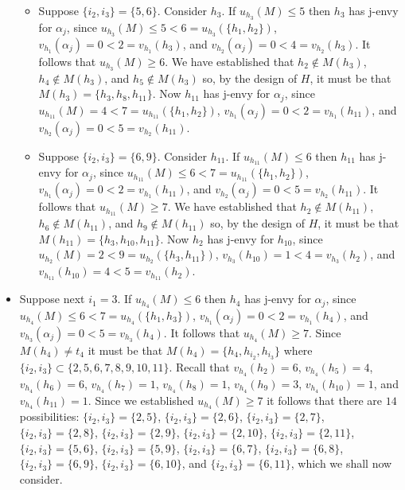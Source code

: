 \begin{itemize}
\begin{itemize}
    \item Suppose $\{ i_2, i_3 \} = \{ 5, 6 \}$. Consider $h_3$. If $u_{h_3}(M) \leq 5$ then $h_3$ has j-envy for $\alpha_{j}$, since $u_{h_3}(M) \leq 5 < 6 = u_{h_3}(\{ h_1, h_2 \})$, $v_{h_1}(\alpha_{j}) = 0 < 2 = v_{h_1}(h_3)$, and $v_{h_2}(\alpha_{j}) = 0 < 4 = v_{h_2}(h_3)$. It follows that $u_{h_3}(M) \geq 6$. We have established that $h_2 \notin M(h_3)$, $h_4 \notin M(h_3)$, and $h_5 \notin M(h_3)$ so, by the design of $H$, it must be that $M(h_3) = \{ h_3, h_8, h_{11} \}$. Now $h_{11}$ has j-envy for $\alpha_{j}$, since $u_{h_{11}}(M) = 4 < 7 = u_{h_{11}}(\{ h_1, h_2 \})$, $v_{h_1}(\alpha_{j}) = 0 < 2 = v_{h_1}(h_{11})$, and $v_{h_2}(\alpha_{j}) = 0 < 5 = v_{h_2}(h_{11})$.
    \item Suppose $\{ i_2, i_3 \} = \{ 6, 9 \}$. Consider $h_{11}$. If $u_{h_{11}}(M) \leq 6$ then $h_{11}$ has j-envy for $\alpha_{j}$, since $u_{h_{11}}(M) \leq 6 < 7 = u_{h_{11}}(\{ h_1, h_2 \})$, $v_{h_1}(\alpha_{j}) = 0 < 2 = v_{h_1}(h_{11})$, and $v_{h_2}(\alpha_{j}) = 0 < 5 = v_{h_2}(h_{11})$. It follows that $u_{h_{11}}(M) \geq 7$. We have established that $h_2 \notin M(h_{11})$, $h_6 \notin M(h_{11})$, and $h_9 \notin M(h_{11})$ so, by the design of $H$, it must be that $M(h_{11}) = \{ h_3, h_{10}, h_{11} \}$. Now $h_2$ has j-envy for $h_{10}$, since $u_{h_2}(M) = 2 < 9 = u_{h_2}(\{ h_3, h_{11} \})$, $v_{h_3}(h_{10}) = 1 < 4 = v_{h_3}(h_2)$, and $v_{h_{11}}(h_{10}) = 4 < 5 = v_{h_{11}}(h_2)$.
\end{itemize}
\item Suppose next $i_1 = 3$. If $u_{h_4}(M) \leq 6$ then $h_4$ has j-envy for $\alpha_{j}$, since $u_{h_4}(M) \leq 6 < 7 = u_{h_4}(\{ h_1, h_3 \})$, $v_{h_1}(\alpha_{j}) = 0 < 2 = v_{h_1}(h_4)$, and $v_{h_3}(\alpha_{j}) = 0 < 5 = v_{h_3}(h_4)$. It follows that $u_{h_4}(M) \geq 7$. Since $M(h_4) \neq t_4$ it must be that $M(h_4) = \{ h_4, h_{i_2}, h_{i_3} \}$ where $\{ i_2, i_3 \} \subset \{ 2, 5, 6, 7, 8, 9, 10, 11 \}$. Recall that $v_{h_4}(h_2)=6$, $v_{h_4}(h_5)=4$, $v_{h_4}(h_6)=6$, $v_{h_4}(h_7)=1$, $v_{h_4}(h_8)=1$, $v_{h_4}(h_9)=3$, $v_{h_4}(h_{10})=1$, and $v_{h_4}(h_{11})=1$. Since we established $u_{h_4}(M) \geq 7$ it follows that there are $14$ possibilities: $\{ i_2, i_3 \} = \{ 2, 5 \}$, $\{ i_2, i_3 \} = \{ 2, 6 \}$, $\{ i_2, i_3 \} = \{ 2, 7 \}$, $\{ i_2, i_3 \} = \{ 2, 8 \}$, $\{ i_2, i_3 \} = \{ 2, 9 \}$, $\{ i_2, i_3 \} = \{ 2, 10 \}$, $\{ i_2, i_3 \} = \{ 2, 11 \}$, $\{ i_2, i_3 \} = \{ 5, 6 \}$, $\{ i_2, i_3 \} = \{ 5, 9 \}$, $\{ i_2, i_3 \} = \{ 6, 7 \}$, $\{ i_2, i_3 \} = \{ 6, 8 \}$, $\{ i_2, i_3 \} = \{ 6, 9 \}$, $\{ i_2, i_3 \} = \{ 6, 10 \}$, and $\{ i_2, i_3 \} = \{ 6, 11 \}$, which we shall now consider.

\end{itemize}
